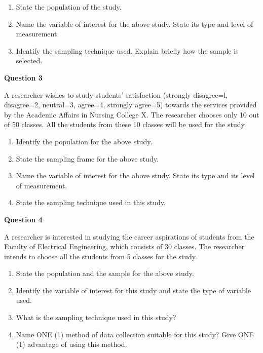 \documentclass[
  a4paper,
  DIV=11,
  numbers=noendperiod,
  oneside]{scrreprt}
\providecommand{\tightlist}{%
  \setlength{\itemsep}{0pt}\setlength{\parskip}{0pt}}\usepackage{longtable,booktabs,array}
\begin{document}
\begin{enumerate}
\def\labelenumi{\alph{enumi})}
\tightlist
\item
  State the population of the study.
\item
  Name the variable of interest for the above study. State its type and
  level of measurement.
\item
  Identify the sampling technique used. Explain briefly how the sample
  is selected.
\end{enumerate}

\textbf{Question 3}

A researcher wishes to study students' satisfaction (strongly
disagree=l, disagree=2, neutral=3, agree=4, strongly agree=5) towards
the services provided by the Academic Affairs in Nursing College X. The
researcher chooses only 10 out of 50 classes. All the students from
these 10 classes will be used for the study.

\begin{enumerate}
\def\labelenumi{\alph{enumi})}
\tightlist
\item
  Identify the population for the above study.
\item
  State the sampling frame for the above study.
\item
  Name the variable of interest for the above study. State its type and
  its level of measurement.
\item
  State the sampling technique used in this study.
\end{enumerate}

\textbf{Question 4}

A researcher is interested in studying the career aspirations of
students from the Faculty of Electrical Engineering, which consists of
30 classes. The researcher intends to choose all the students from 5
classes for the study.

\begin{enumerate}
\def\labelenumi{\alph{enumi})}
\tightlist
\item
  State the population and the sample for the above study.
\item
  Identify the variable of interest for this study and state the type of
  variable used.
\item
  What is the sampling technique used in this study?
\item
  Name ONE (1) method of data collection suitable for this study? Give
  ONE (1) advantage of using this method.
\end{enumerate}
\end{document}

